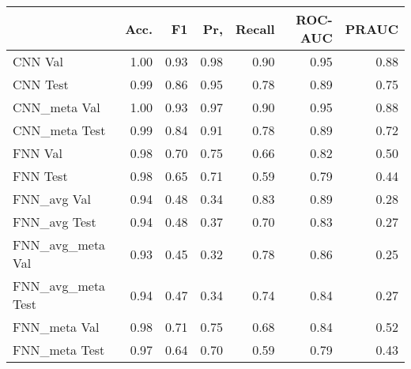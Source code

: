 \begin{tabular}{lrrrrrr}
\toprule
{} &  Acc. &    F1 &   Pr, &  Recall &  ROC-AUC &  PRAUC \\
\midrule
CNN Val           &  1.00 &  0.93 &  0.98 &    0.90 &     0.95 &   0.88 \\
CNN Test          &  0.99 &  0.86 &  0.95 &    0.78 &     0.89 &   0.75 \\
CNN\_meta Val      &  1.00 &  0.93 &  0.97 &    0.90 &     0.95 &   0.88 \\
CNN\_meta Test     &  0.99 &  0.84 &  0.91 &    0.78 &     0.89 &   0.72 \\
FNN Val           &  0.98 &  0.70 &  0.75 &    0.66 &     0.82 &   0.50 \\
FNN Test          &  0.98 &  0.65 &  0.71 &    0.59 &     0.79 &   0.44 \\
FNN\_avg Val       &  0.94 &  0.48 &  0.34 &    0.83 &     0.89 &   0.28 \\
FNN\_avg Test      &  0.94 &  0.48 &  0.37 &    0.70 &     0.83 &   0.27 \\
FNN\_avg\_meta Val  &  0.93 &  0.45 &  0.32 &    0.78 &     0.86 &   0.25 \\
FNN\_avg\_meta Test &  0.94 &  0.47 &  0.34 &    0.74 &     0.84 &   0.27 \\
FNN\_meta Val      &  0.98 &  0.71 &  0.75 &    0.68 &     0.84 &   0.52 \\
FNN\_meta Test     &  0.97 &  0.64 &  0.70 &    0.59 &     0.79 &   0.43 \\
\bottomrule
\end{tabular}
